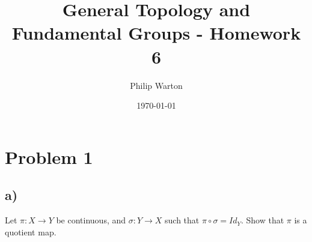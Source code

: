 \documentclass{article}
\theoremstyle{definition}
\begin{document}
\title{General Topology and Fundamental Groups - Homework 6}
\author{Philip Warton}
\date{\today}
\maketitle
\section*{Problem 1}
\subsection*{a)}
\begin{mdframed}
    Let $\pi : X \rightarrow Y$ be continuous, and $\sigma : Y \rightarrow X$ such that $\pi \circ \sigma = Id_Y$. Show that $\pi$ is a quotient map.
\end{mdframed}
\end{document}
